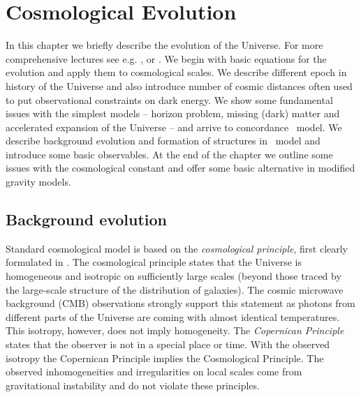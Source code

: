 \chapter{Cosmological Evolution}
\label{chpt:cosmo_evol}
In this chapter we briefly describe the evolution of the Universe. For more comprehensive lectures see e.g. \textcite{Ref:Weinberg}, \textcite{2002col.luc..cosmology} or \textcite{2010deto.book.....A}. We begin with basic equations for the evolution and apply them to cosmological scales. We describe different epoch in history of the Universe and also introduce number of cosmic distances often used to put observational constraints on dark energy. We show some fundamental issues with the simplest models -- horizon problem, missing (dark) matter and accelerated expansion of the Universe -- and arrive to concordance \LCDM\ model. We describe background evolution and formation of structures in \LCDM\ model and introduce some basic observables. At the end of the chapter we outline some issues with the cosmological constant and offer some basic alternative in modified gravity models.

\section{Background evolution}
Standard cosmological model is based on the \textit{cosmological principle}, first clearly formulated in \textcite{1687pnpm.book.....N}. The cosmological principle states that the Universe is homogeneous and isotropic on sufficiently large scales (beyond those traced by the large-scale structure of the distribution of galaxies). The cosmic microwave background (CMB) observations strongly support this statement as photons from different parts of the Universe are coming with almost identical temperatures. This isotropy, however, does not imply homogeneity. The \textit{Copernican Principle} states that the observer is not in a special place or time. With the observed isotropy the Copernican Principle implies the Cosmological Principle. The observed inhomogeneities and irregularities on local scales come from gravitational instability and do not violate these principles.






